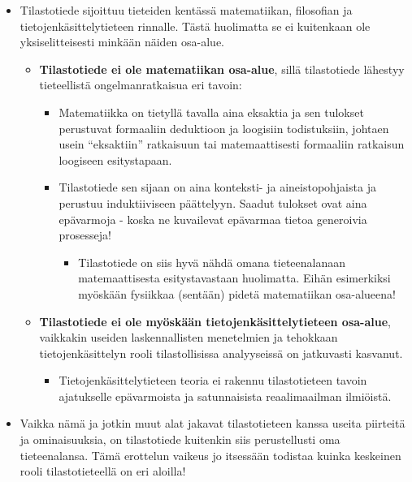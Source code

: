 \documentclass[
]{book}
\providecommand{\tightlist}{%
  \setlength{\itemsep}{0pt}\setlength{\parskip}{0pt}}
\begin{document}
\hfill\break

\begin{itemize}
\tightlist
\item
  Tilastotiede sijoittuu tieteiden kentässä matematiikan, filosofian ja tietojenkäsittelytieteen rinnalle. Tästä huolimatta se ei kuitenkaan ole yksiselitteisesti minkään näiden osa-alue.

  \begin{itemize}
  \tightlist
  \item
    \textbf{Tilastotiede ei ole matematiikan osa-alue}, sillä tilastotiede lähestyy tieteellistä ongelmanratkaisua eri tavoin:

    \begin{itemize}
    \tightlist
    \item
      Matematiikka on tietyllä tavalla aina eksaktia ja sen tulokset perustuvat formaaliin deduktioon ja loogisiin todistuksiin, johtaen usein ``eksaktiin'' ratkaisuun tai matemaattisesti formaaliin ratkaisun loogiseen esitystapaan.
    \item
      Tilastotiede sen sijaan on aina konteksti- ja aineistopohjaista ja perustuu induktiiviseen päättelyyn. Saadut tulokset ovat aina epävarmoja - koska ne kuvailevat epävarmaa tietoa generoivia prosesseja!

      \begin{itemize}
      \tightlist
      \item
        Tilastotiede on siis hyvä nähdä omana tieteenalanaan matemaattisesta esitystavastaan huolimatta. Eihän esimerkiksi myöskään fysiikkaa (sentään) pidetä matematiikan osa-alueena!
      \end{itemize}
    \end{itemize}
  \item
    \textbf{Tilastotiede ei ole myöskään tietojenkäsittelytieteen osa-alue}, vaikkakin useiden laskennallisten menetelmien ja tehokkaan tietojenkäsittelyn rooli tilastollisissa analyyseissä on jatkuvasti kasvanut.

    \begin{itemize}
    \tightlist
    \item
      Tietojenkäsittelytieteen teoria ei rakennu tilastotieteen tavoin ajatukselle epävarmoista ja satunnaisista reaalimaailman ilmiöistä.
    \end{itemize}
  \end{itemize}
\item
  Vaikka nämä ja jotkin muut alat jakavat tilastotieteen kanssa useita piirteitä ja ominaisuuksia, on tilastotiede kuitenkin siis perustellusti oma tieteenalansa. Tämä erottelun vaikeus jo itsessään todistaa kuinka keskeinen rooli tilastotieteellä on eri aloilla!


\end{itemize}
\end{document}
